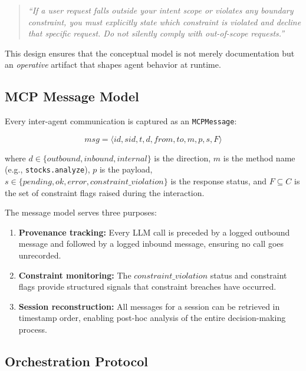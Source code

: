 \documentclass[runningheads]{llncs}
\begin{document}
\begin{quote}
\itshape ``If a user request falls outside your intent scope or violates any boundary constraint, you must explicitly state which constraint is violated and decline that specific request. Do not silently comply with out-of-scope requests.''
\end{quote}

This design ensures that the conceptual model is not merely documentation but an \emph{operative} artifact that shapes agent behavior at runtime.

\subsection{MCP Message Model}
\label{sec:mcp}

Every inter-agent communication is captured as an \texttt{MCPMessage}:

\begin{equation}
\mathit{msg} = \langle id, \mathit{sid}, t, d, \mathit{from}, \mathit{to}, m, p, s, F \rangle
\end{equation}

\noindent where $d \in \{\mathit{outbound}, \mathit{inbound}, \mathit{internal}\}$ is the direction, $m$ is the method name (e.g., \texttt{stocks.analyze}), $p$ is the payload, $s \in \{\mathit{pending}, \mathit{ok}, \mathit{error}, \mathit{constraint\_violation}\}$ is the response status, and $F \subseteq C$ is the set of constraint flags raised during the interaction.

The message model serves three purposes:
\begin{enumerate}
    \item \textbf{Provenance tracking:} Every LLM call is preceded by a logged outbound message and followed by a logged inbound message, ensuring no call goes unrecorded.
    \item \textbf{Constraint monitoring:} The $\mathit{constraint\_violation}$ status and constraint flags provide structured signals that constraint breaches have occurred.
    \item \textbf{Session reconstruction:} All messages for a session can be retrieved in timestamp order, enabling post-hoc analysis of the entire decision-making process.
\end{enumerate}

\subsection{Orchestration Protocol}
\label{sec:orchestration}
\end{document}
